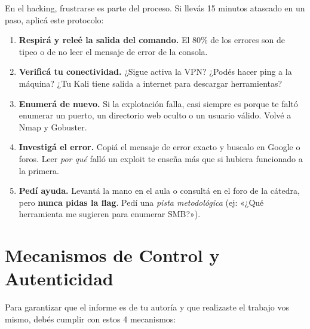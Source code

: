 \documentclass[11pt,a4paper]{article}
\begin{document}
\begin{tip}
En el hacking, frustrarse es parte del proceso. Si llevás 15 minutos atascado en un paso, aplicá este protocolo:
\begin{enumerate}
  \item \textbf{Respirá y releé la salida del comando.} El 80\% de los errores son de tipeo o de no leer el mensaje de error de la consola.
  \item \textbf{Verificá tu conectividad.} ¿Sigue activa la VPN? ¿Podés hacer ping a la máquina? ¿Tu Kali tiene salida a internet para descargar herramientas?
  \item \textbf{Enumerá de nuevo.} Si la explotación falla, casi siempre es porque te faltó enumerar un puerto, un directorio web oculto o un usuario válido. Volvé a Nmap y Gobuster.
  \item \textbf{Investigá el error.} Copiá el mensaje de error exacto y buscalo en Google o foros. Leer \textit{por qué} falló un exploit te enseña más que si hubiera funcionado a la primera.
  \item \textbf{Pedí ayuda.} Levantá la mano en el aula o consultá en el foro de la cátedra, pero \textbf{nunca pidas la flag}. Pedí una \textit{pista metodológica} (ej: «¿Qué herramienta me sugieren para enumerar SMB?»).
\end{enumerate}
\end{tip}

\section{Mecanismos de Control y Autenticidad}
Para garantizar que el informe es de tu autoría y que realizaste el trabajo vos mismo, debés cumplir con estos 4 mecanismos:
\end{document}
